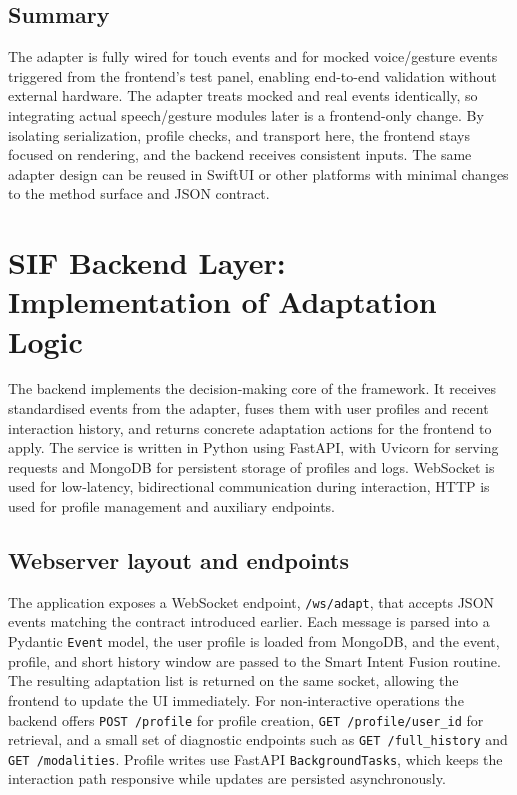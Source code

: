 \documentclass[openany]{book}
\begin{document}
\subsection{Summary}
The adapter is fully wired for touch events and for mocked voice/gesture events triggered from the frontend’s test panel, enabling end-to-end validation without external hardware. The adapter treats mocked and real events identically, so integrating actual speech/gesture modules later is a frontend-only change. By isolating serialization, profile checks, and transport here, the frontend stays focused on rendering, and the backend receives consistent inputs. The same adapter design can be reused in SwiftUI or other platforms with minimal changes to the method surface and JSON contract.

\section{SIF Backend Layer: Implementation of Adaptation Logic}
The backend implements the decision‑making core of the framework. It receives standardised events from the adapter, fuses them with user profiles and recent interaction history, and returns concrete adaptation actions for the frontend to apply. The service is written in Python using FastAPI, with Uvicorn for serving requests and MongoDB for persistent storage of profiles and logs. WebSocket is used for low‑latency, bidirectional communication during interaction, HTTP is used for profile management and auxiliary endpoints.

\subsection{Webserver layout and endpoints}
The application exposes a WebSocket endpoint, \texttt{/ws/adapt}, that accepts JSON events matching the contract introduced earlier. Each message is parsed into a Pydantic \texttt{Event} model, the user profile is loaded from MongoDB, and the event, profile, and short history window are passed to the Smart Intent Fusion routine. The resulting adaptation list is returned on the same socket, allowing the frontend to update the UI immediately. For non‑interactive operations the backend offers \texttt{POST /profile} for profile creation, \texttt{GET /profile/{user\_id}} for retrieval, and a small set of diagnostic endpoints such as \texttt{GET /full\_history} and \texttt{GET /modalities}. Profile writes use FastAPI \texttt{BackgroundTasks}, which keeps the interaction path responsive while updates are persisted asynchronously.
\end{document}
